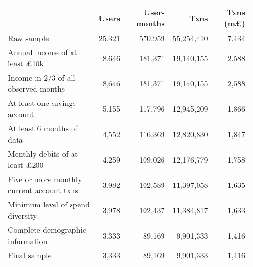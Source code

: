 \begin{tabular}{lrrrr}
\toprule
                                          &  Users & User-months &       Txns & Txns (m\pounds) \\
\midrule
                               Raw sample & 25,321 &     570,959 & 55,254,410 &           7,434 \\
     Annual income of at least \pounds10k &  8,646 &     181,371 & 19,140,155 &           2,588 \\
     Income in 2/3 of all observed months &  8,646 &     181,371 & 19,140,155 &           2,588 \\
             At least one savings account &  5,155 &     117,796 & 12,945,209 &           1,866 \\
                At least 6 months of data &  4,552 &     116,369 & 12,820,830 &           1,847 \\
    Monthly debits of at least \pounds200 &  4,259 &     109,026 & 12,176,779 &           1,758 \\
Five or more monthly current account txns &  3,982 &     102,589 & 11,397,058 &           1,635 \\
         Minimum level of spend diversity &  3,978 &     102,437 & 11,384,817 &           1,633 \\
         Complete demographic information &  3,333 &      89,169 &  9,901,333 &           1,416 \\
                             Final sample &  3,333 &      89,169 &  9,901,333 &           1,416 \\
\bottomrule
\end{tabular}
